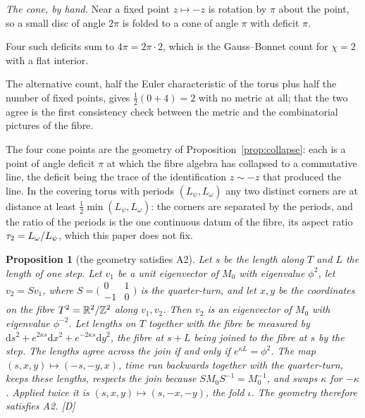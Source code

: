 \documentclass[11pt,a4paper]{article}
\theoremstyle{plain}
\newtheorem{proposition}[theorem]{Proposition}
\theoremstyle{definition}
\theoremstyle{remark}
\newcommand{\rigD}{[\textup{D}]}
\begin{document}
\emph{The cone, by hand.} Near a fixed point $z\mapsto-z$ is rotation by $\pi$ about the point, so a small disc of angle $2\pi$ is folded to a cone of angle $\pi$ with deficit $\pi$.

Four such deficits sum to $4\pi=2\pi\cdot2$, which is the Gauss--Bonnet count for $\chi=2$ with a flat interior.

The alternative count, half the Euler characteristic of the torus plus half the number of fixed points, gives $\tfrac12(0+4)=2$ with no metric at all; that the two agree is the first consistency check between the metric and the combinatorial pictures of the fibre.

The four cone points are the geometry of Proposition~\ref{prop:collapse}: each is a point of angle deficit $\pi$ at which the fibre algebra has collapsed to a commutative line, the deficit being the trace of the identification $z\sim-z$ that produced the line. In the covering torus with periods $(L_{\psi},L_{\omega})$ any two distinct corners are at distance at least $\tfrac12\min(L_{\psi},L_{\omega})$: the corners are separated by the periods, and the ratio of the periods is the one continuous datum of the fibre, its aspect ratio $\tau_2=L_{\omega}/L_{\psi}$, which this paper does not fix.

\begin{proposition}[the geometry satisfies A2]\label{prop:A2}
Let $s$ be the length along $T$ and $L$ the length of one step. Let $v_{1}$ be a unit eigenvector of $M_{0}$ with eigenvalue $\phi^{2}$, let $v_{2}=Sv_{1}$, where $S=\bigl(\begin{smallmatrix}0&1\\-1&0\end{smallmatrix}\bigr)$ is the quarter-turn, and let $x,y$ be the coordinates on the fibre $T^2=\mathbb{R}^{2}/\mathbb{Z}^{2}$ along $v_{1},v_{2}$. Then $v_{2}$ is an eigenvector of $M_{0}$ with eigenvalue $\phi^{-2}$. Let lengths on $T$ together with the fibre be measured by $\mathrm{d}s^{2}+e^{2\kappa s}\mathrm{d}x^{2}+e^{-2\kappa s}\mathrm{d}y^{2}$, the fibre at $s+L$ being joined to the fibre at $s$ by the step. The lengths agree across the join if and only if $e^{\kappa L}=\phi^{2}$. The map $(s,x,y)\mapsto(-s,-y,x)$, time run backwards together with the quarter-turn, keeps these lengths, respects the join because $SM_{0}S^{-1}=M_{0}^{-1}$, and swaps $\kappa$ for $-\kappa$. Applied twice it is $(s,x,y)\mapsto(s,-x,-y)$, the fold $\iota$. The geometry therefore satisfies A2. \rigD
\end{proposition}
\end{document}
